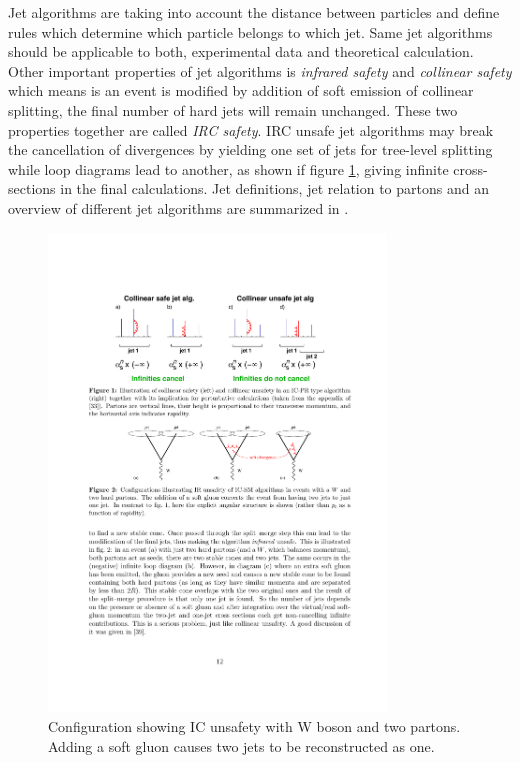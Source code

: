 Jet algorithms are taking into account the distance between particles and define rules which determine which particle belongs to which jet. Same jet algorithms should be applicable to both, experimental data and theoretical calculation.  Other important properties of jet algorithms is \textit{infrared safety} and \textit{collinear safety} which means is an event is modified by addition of soft emission of collinear splitting, the final number of hard jets will remain unchanged. These two properties together are called \textit{IRC safety}. IRC unsafe jet algorithms may break the cancellation of divergences by yielding one set of jets for tree-level splitting while loop diagrams lead to another, as shown if figure \ref{fig:jet_unsafe}, giving infinite cross-sections in the final calculations. Jet definitions, jet relation to partons and an overview of different jet algorithms are summarized in \cite{Salam:2009jx}.
\begin{figure}[htbp]
	\centering
		\includegraphics[width=0.8\textwidth]{Figures/jet_unsafe2.pdf}
	\caption[An example of configuration of IRC unsafe jet algorithm.]{Configuration showing IC  unsafety with W boson and two partons. Adding a soft gluon causes two jets to be reconstructed as one. \cite{Salam:2009jx}}
	\label{fig:jet_unsafe}
\end{figure}

